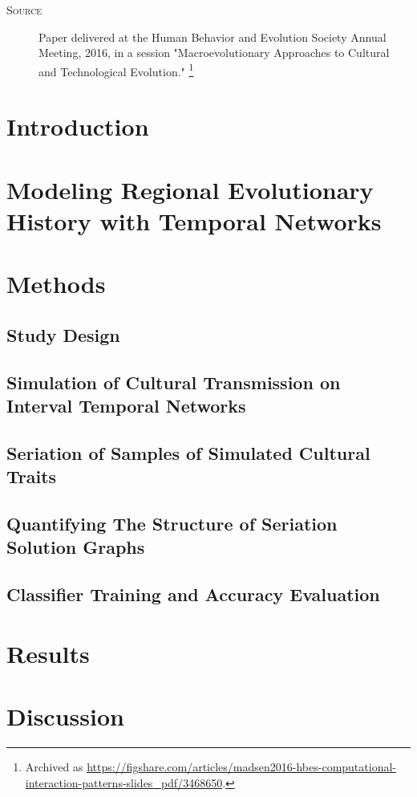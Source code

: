 \begin{description}
    \item[\textsc{Source}]  Paper delivered at the Human Behavior and Evolution Society Annual Meeting, 2016, in a session "Macroevolutionary Approaches to Cultural and Technological Evolution."  
    \footnote{Archived as \url{https://figshare.com/articles/madsen2016-hbes-computational-interaction-patterns-slides_pdf/3468650}.}
    \end{description}


\section{Introduction}\label{metapop:sec:introduction}


\section{Modeling Regional Evolutionary History with Temporal Networks}\label{metapop:sec:temporal-networks}



\section{Methods}\label{metapop:sec:methods}

\subsection{Study Design}\label{metapop:sec:study-design}




\subsection{Simulation of Cultural Transmission on Interval Temporal Networks}\label{metapop:sec:simulation}



\subsection{Seriation of Samples of Simulated Cultural Traits}\label{metapop:sec:seriation}



\subsection{Quantifying The Structure of Seriation Solution Graphs}\label{metapop:sec:structure-seriations}



\subsection{Classifier Training and Accuracy Evaluation}\label{metapop:sec:classifier}




\section{Results}\label{metapop:sec:results}



\section{Discussion}\label{metapop:sec:discussion}



